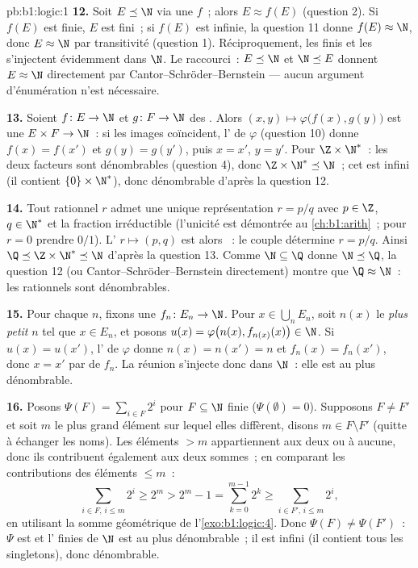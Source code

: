 \begin{solution}{pb:b1:logic:1}
\textbf{12.} Soit $E \preceq \N$ via une  $f$~; alors $E
\approx f(E)$ (question 2). Si $f(E)$ est finie, $E$ est fini~; si
$f(E)$ est infinie, la question 11 donne $f(E) \approx \N$, donc
$E \approx \N$ par transitivité (question 1). Réciproquement, les
 finis et les  s'injectent évidemment
dans $\N$. Le raccourci~: $E \preceq \N$ et $\N \preceq E$ donnent
$E \approx \N$ directement par
Cantor--Schröder--Bernstein --- aucun argument d'énumération n'est
nécessaire.

\textbf{13.} Soient $f \colon E \to \N$ et $g \colon F \to \N$ des
. Alors $(x, y) \mapsto \varphi\bigl(f(x), g(y)\bigr)$ est
une  $E \times F \to \N$~: si les images coïncident,
l' de $\varphi$ (question 10) donne $f(x) = f(x')$ et
$g(y) = g(y')$, puis $x = x'$, $y = y'$. Pour $\Z \times \N^*$~: les
deux facteurs sont dénombrables (question 4), donc $\Z \times \N^*
\preceq \N$~; cet  est infini (il contient $\{0\} \times \N^*$),
donc dénombrable d'après la question 12.

\textbf{14.} Tout rationnel $r$ admet une unique représentation $r =
p/q$ avec $p \in \Z$, $q \in \N^*$ et la fraction irréductible
(l'unicité est démontrée au \cref{ch:b1:arith}~; pour $r = 0$ prendre
$0/1$). L' $r \mapsto (p, q)$ est alors ~: le
couple détermine $r = p/q$. Ainsi $\Q \preceq \Z \times \N^* \preceq \N$
d'après la question 13. Comme $\N \subseteq \Q$ donne $\N \preceq \Q$,
la question 12 (ou Cantor--Schröder--Bernstein directement) montre que
$\Q \approx \N$~: les rationnels sont dénombrables.

\textbf{15.} Pour chaque $n$, fixons une  $f_n \colon E_n \to
\N$. Pour $x \in \bigcup_n E_n$, soit $n(x)$ le \emph{plus petit} $n$
tel que $x \in E_n$, et posons $u(x) = \varphi\bigl(n(x),
f_{n(x)}(x)\bigr) \in \N$. Si $u(x) = u(x')$, l' de
$\varphi$ donne $n(x) = n(x') = n$ et $f_n(x) = f_n(x')$, donc $x = x'$
par  de $f_n$. La réunion s'injecte donc dans $\N$~: elle est
au plus dénombrable.

\textbf{16.} Posons $\Psi(F) = \sum_{i \in F} 2^i$ pour $F \subseteq \N$
finie ($\Psi(\emptyset) = 0$). Supposons $F \neq F'$ et soit $m$ le
plus grand élément sur lequel elles diffèrent, disons $m \in F \setminus
F'$ (quitte à échanger les noms). Les éléments $> m$ appartiennent aux
deux ou à aucune, donc ils contribuent également aux deux sommes~; en
comparant les contributions des éléments $\leq m$~:
\[
\sum_{i \in F,\, i \leq m} 2^i \geq 2^m
> 2^m - 1 = \sum_{k=0}^{m-1} 2^k
\geq \sum_{i \in F',\, i \leq m} 2^i ,
\]
en utilisant la somme géométrique de l'\cref{exo:b1:logic:4}. Donc
$\Psi(F) \neq \Psi(F')$~: $\Psi$ est  et l' finies de $\N$ est au plus dénombrable~; il est infini (il
contient tous les singletons), donc dénombrable.


\end{solution}
